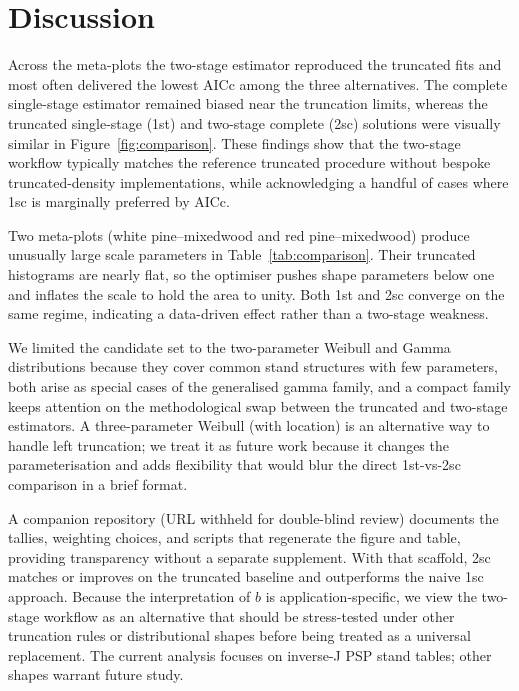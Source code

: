 \section{Discussion}

Across the meta-plots the two-stage estimator reproduced the truncated fits and most often delivered the lowest AICc among the three alternatives. The complete single-stage estimator remained biased near the truncation limits, whereas the truncated single-stage (1st) and two-stage complete (2sc) solutions were visually similar in Figure~\ref{fig:comparison}. These findings show that the two-stage workflow typically matches the reference truncated procedure without bespoke truncated-density implementations, while acknowledging a handful of cases where 1sc is marginally preferred by AICc.

Two meta-plots (white pine--mixedwood and red pine--mixedwood) produce unusually large scale parameters in Table~\ref{tab:comparison}. Their truncated histograms are nearly flat, so the optimiser pushes shape parameters below one and inflates the scale to hold the area to unity. Both 1st and 2sc converge on the same regime, indicating a data-driven effect rather than a two-stage weakness.

We limited the candidate set to the two-parameter Weibull and Gamma distributions because they cover common stand structures with few parameters, both arise as special cases of the generalised gamma family, and a compact family keeps attention on the methodological swap between the truncated and two-stage estimators. A three-parameter Weibull (with location) is an alternative way to handle left truncation; we treat it as future work because it changes the parameterisation and adds flexibility that would blur the direct 1st-vs-2sc comparison in a brief format.

A companion repository (URL withheld for double-blind review) documents the tallies, weighting choices, and scripts that regenerate the figure and table, providing transparency without a separate supplement. With that scaffold, 2sc matches or improves on the truncated baseline and outperforms the naive 1sc approach. Because the interpretation of $b$ is application-specific, we view the two-stage workflow as an alternative that should be stress-tested under other truncation rules or distributional shapes before being treated as a universal replacement. The current analysis focuses on inverse-J PSP stand tables; other shapes warrant future study.
